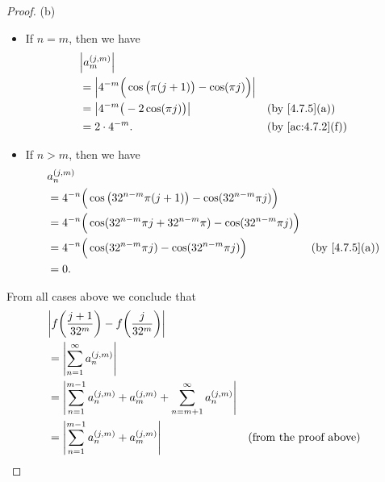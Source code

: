 \begin{proof}{(b)}
\begin{itemize}
    \item If \(n = m\), then we have
          \begin{align*}
             & \abs{a_m^{(j, m)}}                                                                                   \\
             & = \abs{4^{-m} \Big(\cos\big(\pi (j + 1)\big) - \cos(\pi j)\Big)}                                     \\
             & = \abs{4^{-m} \big(-2 \cos(\pi j)\big)}                          &  & \text{(by \cref{4.7.5}(a))}    \\
             & = 2 \cdot 4^{-m}.                                                &  & \text{(by \cref{ac:4.7.2}(f))}
          \end{align*}
    \item If \(n > m\), then we have
          \begin{align*}
             & a_n^{(j, m)}                                                                                                         \\
             & = 4^{-n} \Big(\cos\big(32^{n - m} \pi (j + 1)\big) - \cos(32^{n - m} \pi j)\Big)                                     \\
             & = 4^{-n} \Big(\cos(32^{n - m} \pi j + 32^{n - m} \pi) - \cos(32^{n - m} \pi j)\Big)                                  \\
             & = 4^{-n} \Big(\cos(32^{n - m} \pi j) - \cos(32^{n - m} \pi j)\Big)                  &  & \text{(by \cref{4.7.5}(a))} \\
             & = 0.
          \end{align*}
  \end{itemize}
  From all cases above we conclude that
  \begin{align*}
     & \abs{f\bigg(\dfrac{j + 1}{32^m}\bigg) - f\bigg(\dfrac{j}{32^m}\bigg)}                                                                                                  \\
     & = \abs{\sum_{n = 1}^\infty a_n^{(j, m)}}                                                                                                                               \\
     & = \abs{\sum_{n = 1}^{m - 1} a_n^{(j, m)} + a_m^{(j, m)} + \sum_{n = m + 1}^\infty a_n^{(j, m)}}                                                                        \\
     & = \abs{\sum_{n = 1}^{m - 1} a_n^{(j, m)} + a_m^{(j, m)}}                                        &                                      & \text{(from the proof above)} \\

\end{align*}
\end{proof}
